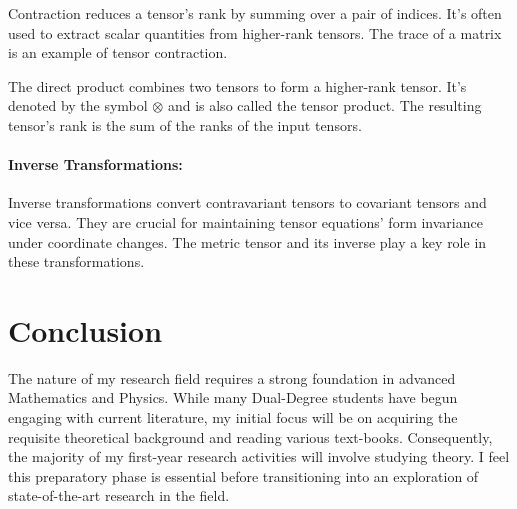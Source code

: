 \documentclass[11pt]{article}
\begin{document}
Contraction reduces a tensor's rank by summing over a pair of indices.
It's often used to extract scalar quantities from higher-rank tensors.
The trace of a matrix is an example of tensor contraction.

The direct product combines two tensors to form a higher-rank tensor.
It's denoted by the symbol $\otimes$ and is also called the tensor product.
The resulting tensor's rank is the sum of the ranks of the input tensors.

\paragraph{Inverse Transformations:}

Inverse transformations convert contravariant tensors to covariant tensors and vice versa.
They are crucial for maintaining tensor equations' form invariance under coordinate changes.
The metric tensor and its inverse play a key role in these transformations.

\section{Conclusion}

The nature of my research field requires a strong foundation in advanced
Mathematics and Physics. While many Dual-Degree students have begun engaging
with current literature, my initial focus will be on acquiring the requisite
theoretical background and reading various text-books. Consequently, the majority of my first-year research
activities will involve studying theory. I feel this preparatory phase is essential before transitioning into an
exploration of state-of-the-art research in the field.
\end{document}
